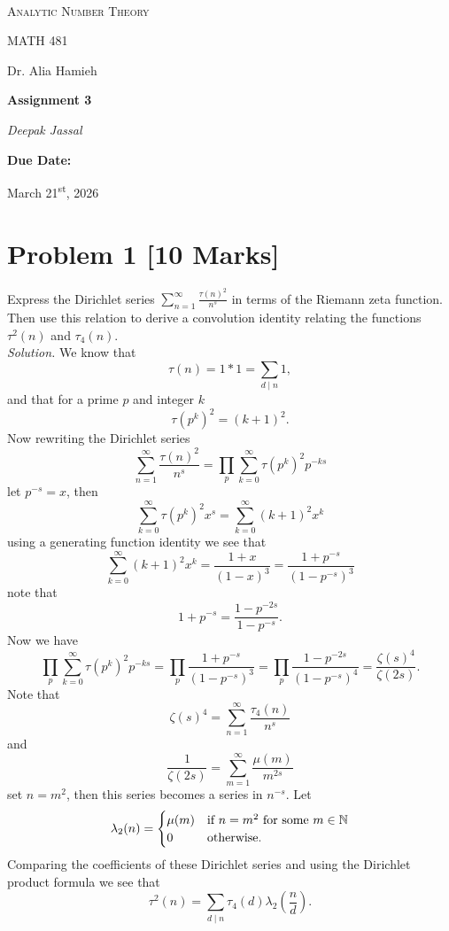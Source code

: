 \documentclass[12pt]{article}
\renewcommand{\author}{Deepak Jassal}
\renewcommand{\coursename}{Analytic Number Theory}
\renewcommand{\coursecode}{MATH 481}
\renewcommand{\assignment}{Assignment 3}
\renewcommand{\instructor}{Dr. Alia Hamieh}
\renewcommand{\duedate}{March 21\textsuperscript{st}, 2026}
\begin{document}
\begin{titlepage}
	\centering
	\vspace*{2.0cm}	
	\\
	{\LARGE \textsc{\coursename}\par}
	\vspace{0.5cm}
	{\large\coursecode\par}
    \vspace{0.5cm}
    {\large\instructor\par}
	\vspace{1.5cm}
	{\huge\bfseries\assignment\par}
	\vspace{1cm}  
	{\LARGE\itshape\author\par}
    \vspace{2cm}
	{\large\bfseries Due Date:\par}
	\vspace{0.5cm}
	{\Large \duedate}\\
\end{titlepage}
\section*{Problem 1 [10 Marks]} Express the Dirichlet series $\sum_{n=1}^{\infty} \frac{\tau(n)^2}{n^s}$ in terms of the Riemann zeta function. Then use this relation to derive a convolution identity relating the functions $\tau^2(n)$ and $\tau_4(n)$.\\
\textit{Solution.} We know that 
\[
    \tau(n)=1\ast1=\sum_{d\mid n}1,
\]
and that for a prime $p$ and integer $k$
\[
    \tau(p^k)^2=(k+1)^2.
\]
Now rewriting the Dirichlet series
\[
    \sum_{n=1}^{\infty} \frac{\tau(n)^2}{n^s}=\prod_{p}\sum_{k=0}^{\infty}\tau(p^k)^2p^{-ks}
\] 
let $p^{-s}=x$, then
\[
    \sum_{k=0}^{\infty}\tau(p^k)^2x^s=\sum_{k=0}^{\infty}(k+1)^2x^k
\]
using a generating function identity we see that
\[
    \sum_{k=0}^{\infty}(k+1)^2x^k=\frac{1+x}{(1-x)^3}=\frac{1+p^{-s}}{(1-p^{-s})^3}
\]
note that 
\[
    1+p^{-s}=\frac{1-p^{-2s}}{1-p^{-s}}.
\]
Now we have
\[
    \prod_{p}\sum_{k=0}^{\infty}\tau(p^k)^2p^{-ks}=\prod_{p}\frac{1+p^{-s}}{(1-p^{-s})^3}=\prod_{p}\frac{1-p^{-2s}}{(1-p^{-s})^4}=\frac{\zeta(s)^4}{\zeta(2s)}.
\]
Note that
\[
    \zeta(s)^4=\sum_{n=1}^{\infty}\frac{\tau_4(n)}{n^{s}}
\]
and
\[
    \frac{1}{\zeta(2s)}=\sum_{m=1}^{\infty}\frac{\mu(m)}{m^{2s}}
\]
set $n=m^2$, then this series becomes a series in $n^{-s}$. Let
\[
    \lambda_2(n)=
    \begin{cases}
        \mu(m)&\text{if } n=m^2 \text{ for some } m\in\mathbb{N}\\
        0&\text{otherwise.}    
    \end{cases}
\]
Comparing the coefficients of these Dirichlet series and using the Dirichlet product formula we see that
\[
    \tau^2(n)=\sum_{d\mid n}\tau_4(d)\lambda_2\left(\frac{n}{d}\right).
\]
\end{document}
